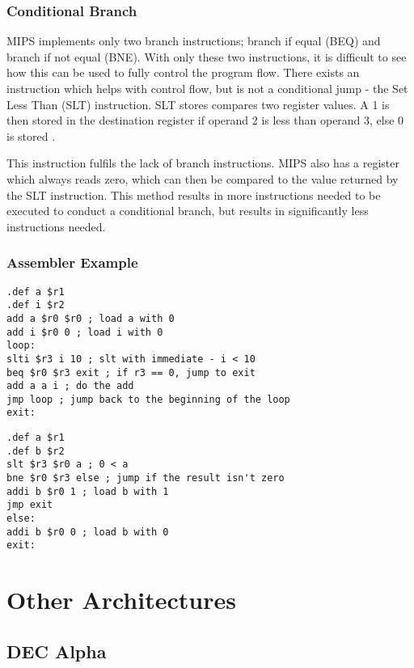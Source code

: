 \documentclass[12pt,a4paper]{article}
\begin{document}
\begin{bibunit}[is-unsrt]
\subsubsection{Conditional Branch}

MIPS implements only two branch instructions; branch if equal (BEQ) and branch if not equal (BNE).
With only these two instructions, it is difficult to see how this can be used to fully control the program flow.
There exists an instruction which helps with control flow, but is not a conditional jump - the Set Less Than (SLT) instruction.
SLT stores compares two register values.
A 1 is then stored in the destination register if operand 2 is less than operand 3, else 0 is stored \cite{patterson2013computer}.

This instruction fulfils the lack of branch instructions.
MIPS also has a register which always reads zero, which can then be compared to the value returned by the SLT instruction.
This method results in more instructions needed to be executed to conduct a conditional branch, but results in significantly less instructions needed.



\subsubsection{Assembler Example}
\begin{lstlisting}[frame=single,caption=MIPS assembler for listing \ref{ListC},label=mips1]
.def a $r1
.def i $r2
add a $r0 $r0 ; load a with 0
add i $r0 0 ; load i with 0
loop:
slti $r3 i 10 ; slt with immediate - i < 10
beq $r0 $r3 exit ; if r3 == 0, jump to exit
add a a i ; do the add
jmp loop ; jump back to the beginning of the loop
exit:
\end{lstlisting}
\begin{lstlisting}[frame=single,caption=MIPS assembler for listing \ref{ListC2},label=mips2]
.def a $r1
.def b $r2
slt $r3 $r0 a ; 0 < a
bne $r0 $r3 else ; jump if the result isn't zero
addi b $r0 1 ; load b with 1
jmp exit
else:
addi b $r0 0 ; load b with 0
exit:
\end{lstlisting}


\section{Other Architectures}
\subsection{DEC Alpha}


\end{bibunit}
\end{document}
